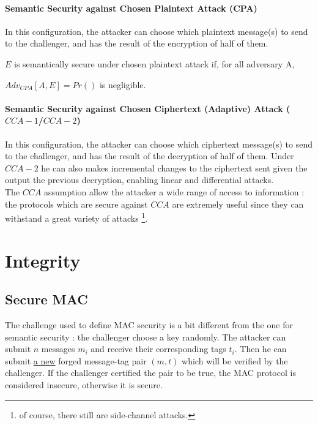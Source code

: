 \paragraph{Semantic Security against Chosen Plaintext Attack (CPA)\\}

In this configuration, the attacker can choose which plaintext message(s) to send to the challenger, and has the result of the encryption of half of them. 

\begin{mytheorem}
$E$ is semantically secure  under chosen plaintext attack if, for all adversary A,
     
\flushright	  $Adv_{CPA}[A,E] = Pr()$ is negligible.
\end{mytheorem}

\paragraph{Semantic Security against Chosen Ciphertext (Adaptive) Attack ($CCA-1$/$CCA-2$)\\}

In this configuration, the attacker can choose which ciphertext message(s) to send to the challenger, and has the result of the decryption of half of them. Under $CCA-2$ he can also makes incremental changes to the ciphertext sent given the output the previous decryption, enabling linear and differential attacks. \\
The $CCA$ assumption allow the attacker a wide range of access to information : the protocols which are secure against $CCA$ are extremely useful since they can withstand a great variety of attacks \footnote{of course, there still are side-channel attacks.}.

\section{Integrity}

\subsection{Secure MAC}

The challenge used to define MAC security is a bit different from the one for semantic security : the challenger choose a key randomly. The attacker can submit $n$ messages $m_i$ and receive their corresponding tags $t_i$. Then he can submit \underline{a new} forged message-tag pair $(m,t)$ which will be verified by the challenger. If the challenger certified the pair to be true, the MAC protocol is considered insecure, otherwise it is secure.

